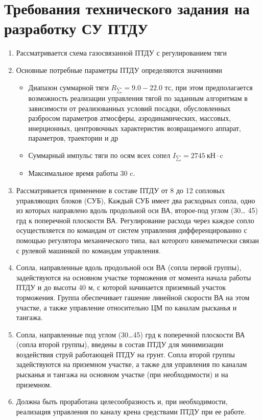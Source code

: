 \section{Требования технического задания на разработку СУ ПТДУ}

\begin{enumerate}
	\item Рассматривается схема газосвязанной ПТДУ с регулированием тяги
	
	\item Основные потребные параметры ПТДУ определяются значениями
	\begin{itemize}
		\item Диапазон суммарной тяги $R_{\sum} = 9.0 - 22.0$ тс, при этом предполагается возможность реализации управления тягой по заданным алгоритмам в зависимости от реализованных условий посадки, обусловленных разбросом параметров атмосферы, аэродинамических, массовых, инерционных, центровочных характеристик возвращаемого аппарат, параметров, траектории и др
		\item Суммарный импульс тяги по осям всех сопел $I_{\sum} = 2745 \  \text{кН} \cdot \text{c}$
		\item Максимальное время работы $30$ c.
	\end{itemize}
	\item Рассматривается применение в составе ПТДУ от 8 до 12 сопловых управляющих блоков (СУБ), Каждый СУБ имеет два расходных сопла, одно из которых направлено вдоль продольной оси ВА, второе-под углом (30… 45) грд к поперечной плоскости ВА. Регулирование расхода через каждое сопло осуществляется по командам от систем управления дифференцированно с помощью регулятора механического типа, вал которого кинематически связан с рулевой машинкой по командам управления.
	
	\item Сопла, направленные вдоль продольной оси ВА (сопла первой группы), задействуются на основном участке торможения от момента начала работы ПТДУ и до высоты 40 м, с которой начинается приземный участок торможения. Группа обеспечивает гашение линейной скорости ВА на этом участке, а также управление относительно ЦМ по каналам рысканья и тангажа.
	
	\item Сопла, направленные под углом (30…45) грд к поперечной плоскости ВА (сопла второй группы), введены в состав ПТДУ для минимизации воздействия струй работающей ПТДУ на грунт. Сопла второй группы задействуются на приземном участке, а также для управления по каналам рысканья и тангажа на основном участке (при необходимости) и на приземном.
	
	\item Должна быть проработана целесообразность и, при необходимости, реализация управления по каналу крена средствами ПТДУ при ее работе.
\end{enumerate}
\clearpage

